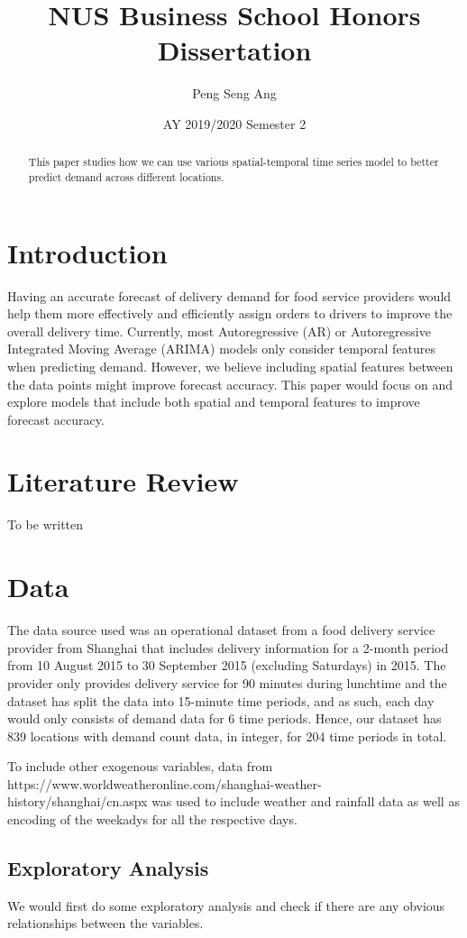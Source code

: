 \documentclass[10pt, letterpaper] {article}
\begin{document}
	\title{NUS Business School Honors Dissertation}
	\author{Peng Seng Ang}
	\date{AY 2019/2020 Semester 2}
	\maketitle
\begin{abstract}
This paper studies how we can use various spatial-temporal time series model to better predict demand across different locations. 
\end{abstract}
\section{Introduction}
Having an accurate forecast of delivery demand for food service providers would help them more effectively and efficiently assign orders to drivers to improve the overall delivery time. Currently, most Autoregressive (AR) or Autoregressive Integrated Moving Average (ARIMA) models only consider temporal features when predicting demand. However, we believe including spatial features between the data points might improve forecast accuracy. This paper would focus on and explore models that include both spatial and temporal features to improve forecast accuracy. 

\section{Literature Review}
To be written

\section{Data}
The data source used was an operational dataset from a food delivery service provider from Shanghai that includes delivery information for a 2-month period from 10 August 2015 to 30 September 2015 (excluding Saturdays) in 2015. The provider only provides delivery service for 90 minutes during lunchtime and the dataset has split the data into 15-minute time periods, and as such, each day would only consists of demand data for 6 time periods. Hence, our dataset has 839 locations with demand count data, in integer, for 204 time periods in total. 

To include other exogenous variables, data from https://www.worldweatheronline.com/shanghai-weather-history/shanghai/cn.aspx was used to include weather and rainfall data as well as encoding of the weekadys for all the respective days. 

\subsection{Exploratory Analysis}
We would first do some exploratory analysis and check if there are any obvious relationships between the variables.
\end{document}
